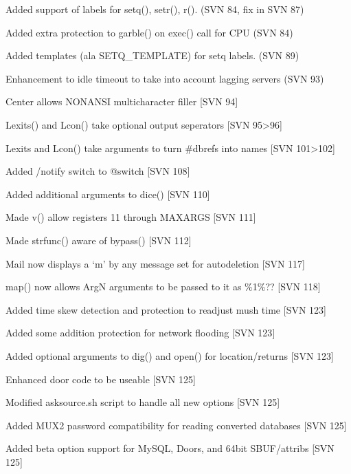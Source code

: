 \documentclass[letterpaper,10pt,english]{sphinxmanual}
\begin{document}
\sphinxAtStartPar
Added support of labels for setq(), setr(), r(). (SVN 84, fix in SVN 87)

\sphinxAtStartPar
Added extra protection to garble() on exec() call for CPU (SVN 84)

\sphinxAtStartPar
Added templates (ala SETQ\_TEMPLATE) for setq labels. (SVN 89)

\sphinxAtStartPar
Enhancement to idle timeout to take into account lagging servers (SVN 93)

\sphinxAtStartPar
Center allows NON\sphinxhyphen{}ANSI multi\sphinxhyphen{}character filler {[}SVN 94{]}

\sphinxAtStartPar
Lexits() and Lcon() take optional output seperators {[}SVN 95\sphinxhyphen{}\textgreater{}96{]}

\sphinxAtStartPar
Lexits and Lcon() take arguments to turn \#dbrefs into names {[}SVN 101\sphinxhyphen{}\textgreater{}102{]}

\sphinxAtStartPar
Added /notify switch to @switch {[}SVN 108{]}

\sphinxAtStartPar
Added additional arguments to dice() {[}SVN 110{]}

\sphinxAtStartPar
Made v() allow registers 11 through MAX\sphinxhyphen{}ARGS {[}SVN 111{]}

\sphinxAtStartPar
Made strfunc() aware of bypass() {[}SVN 112{]}

\sphinxAtStartPar
Mail now displays a ‘m’ by any message set for auto\sphinxhyphen{}deletion {[}SVN 117{]}

\sphinxAtStartPar
map() now allows ArgN arguments to be passed to it as \%1\sphinxhyphen{}\%?? {[}SVN 118{]}

\sphinxAtStartPar
Added time skew detection and protection to readjust mush time {[}SVN 123{]}

\sphinxAtStartPar
Added some addition protection for network flooding {[}SVN 123{]}

\sphinxAtStartPar
Added optional arguments to dig() and open() for location/returns {[}SVN 123{]}

\sphinxAtStartPar
Enhanced door code to be useable {[}SVN 125{]}

\sphinxAtStartPar
Modified asksource.sh script to handle all new options {[}SVN 125{]}

\sphinxAtStartPar
Added MUX2 password compatibility for reading converted databases {[}SVN 125{]}

\sphinxAtStartPar
Added beta option support for MySQL, Doors, and 64bit SBUF/attribs {[}SVN 125{]}
\end{document}
